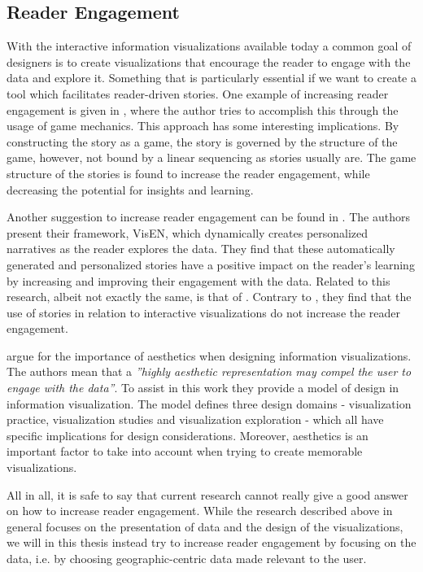 \documentclass{acmtog} %
\begin{document}
\subsection{Reader Engagement}
\label{sub:reader_engagement}
With the interactive information visualizations available today a common goal of designers is to create visualizations that encourage the reader to engage with the data and explore it. Something that is particularly essential if we want to create a tool which facilitates reader-driven stories. One example of increasing reader engagement is given in \citet{diakopoulos2011playable}, where the author tries to accomplish this through the usage of game mechanics. This approach has some interesting implications. By constructing the story as a game, the story is governed by the structure of the game, however, not bound by a linear sequencing as stories usually are. The game structure of the stories is found to increase the reader engagement, while decreasing the potential for insights and learning.

Another suggestion to increase reader engagement can be found in \citet{yousuf2014constructing}. The authors present their framework, VisEN, which dynamically creates personalized narratives as the reader explores the data. They find that these automatically generated and personalized stories have a positive impact on the reader's learning by increasing and improving their engagement with the data. Related to this research, albeit not exactly the same, is that of \citet{boy2015can}. Contrary to \citet{yousuf2014constructing}, they find that the use of stories in relation to interactive visualizations do not increase the reader engagement. 

\citet{moere2011role} argue for the importance of aesthetics when designing information visualizations. The authors mean that a \emph{''highly aesthetic representation may compel the user to engage with the data''}. To assist in this work they provide a model of design in information visualization. The model defines three design domains - visualization practice, visualization studies and visualization exploration - which all have specific implications for design considerations. Moreover, aesthetics is an important factor to take into account when trying to create memorable visualizations.

All in all, it is safe to say that current research cannot really give a good answer on how to increase reader engagement. While the research described above in general focuses on the presentation of data and the design of the visualizations, we will in this thesis instead try to increase reader engagement by focusing on the data, i.e. by choosing geographic-centric data made relevant to the user. 
\end{document}
